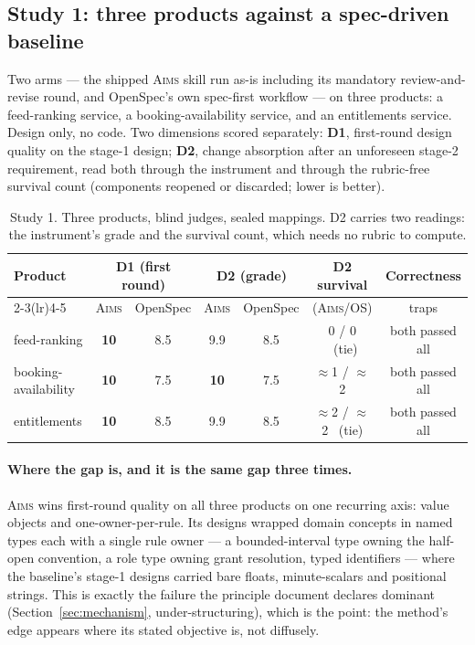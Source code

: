\documentclass[11pt]{article}
\newcommand{\aims}{\textsc{Aims}}
\newcommand{\best}[1]{\textbf{#1}}
\begin{document}
\subsection{Study 1: three products against a spec-driven baseline}

Two arms --- the shipped \aims{} skill run as-is including its mandatory review-and-revise round, and OpenSpec's own spec-first workflow --- on three products: a feed-ranking service, a booking-availability service, and an entitlements service. Design only, no code. Two dimensions scored separately: \textbf{D1}, first-round design quality on the stage-1 design; \textbf{D2}, change absorption after an unforeseen stage-2 requirement, read both through the instrument and through the rubric-free survival count (components reopened or discarded; lower is better).

\begin{table}[h]
\centering\small
\caption{Study 1. Three products, blind judges, sealed mappings. D2 carries two readings: the instrument's grade and the survival count, which needs no rubric to compute.}
\label{tab:study1}
\begin{tabular}{lcccccc}
\toprule
\multirow{2}{*}{Product} & \multicolumn{2}{c}{D1 (first round)} & \multicolumn{2}{c}{D2 (grade)} & D2 survival & Correctness \\
\cmidrule(lr){2-3}\cmidrule(lr){4-5}
 & \aims{} & OpenSpec & \aims{} & OpenSpec & (\aims{}/OS) & traps \\
\midrule
feed-ranking         & \best{10} & 8.5 & 9.9 & 8.5 & 0 / 0 \ (tie) & both passed all \\
booking-availability & \best{10} & 7.5 & \best{10} & 7.5 & $\approx$1 / $\approx$2 & both passed all \\
entitlements         & \best{10} & 8.5 & 9.9 & 8.5 & $\approx$2 / $\approx$2 \ (tie) & both passed all \\
\bottomrule
\end{tabular}
\end{table}

\paragraph{Where the gap is, and it is the same gap three times.} \aims{} wins first-round quality on all three products on one recurring axis: value objects and one-owner-per-rule. Its designs wrapped domain concepts in named types each with a single rule owner --- a bounded-interval type owning the half-open convention, a role type owning grant resolution, typed identifiers --- where the baseline's stage-1 designs carried bare floats, minute-scalars and positional strings. This is exactly the failure the principle document declares dominant (Section~\ref{sec:mechanism}, under-structuring), which is the point: the method's edge appears where its stated objective is, not diffusely.
\end{document}
